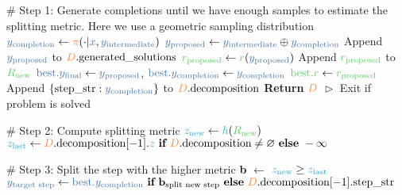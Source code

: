 \begin{algorithm}[h!]
\begin{algorithmic}[1]
        \STATE \textcolor{algcolor1}{\# Step 1: Generate completions until we have enough samples to estimate the splitting metric. Here we use a geometric sampling distribution}
            \STATE $\textcolor{algcolor3}{y_{\text{completion}}} \gets \textcolor{algcolor6}{\pi}(\cdot | \textcolor{algcolor3}{x}, \textcolor{algcolor3}{y_{\text{intermediate}}})$
            \STATE $\textcolor{algcolor3}{y_{\text{proposed}}} \gets \textcolor{algcolor3}{y_{\text{intermediate}}} \oplus \textcolor{algcolor3}{y_{\text{completion}}}$
            \STATE Append $\textcolor{algcolor3}{y_{\text{proposed}}}$ to $\textcolor{algcolor6}{D}.\text{generated\_solutions}$
            \STATE $\textcolor{algcolor4}{r_{\text{proposed}}} \gets \textcolor{algcolor4}{r}(\textcolor{algcolor3}{y_{\text{proposed}}})$
            \STATE Append $\textcolor{algcolor4}{r_{\text{proposed}}}$ to $\textcolor{algcolor4}{R_{\text{new}}}$
                \STATE $\textcolor{algcolor3}{\text{best}.y_{\text{final}}} \gets \textcolor{algcolor3}{y_{\text{proposed}}}$, $\textcolor{algcolor3}{\text{best}.y_{\text{completion}}} \gets \textcolor{algcolor3}{y_{\text{completion}}}$
                \STATE $\textcolor{algcolor4}{\text{best}.r} \gets \textcolor{algcolor4}{r_{\text{proposed}}}$
            \ENDIF
                \STATE Append $\{\text{step\_str}: \textcolor{algcolor3}{y_{\text{completion}}} \}$ to $\textcolor{algcolor6}{D}.\text{decomposition}$
                \STATE \textbf{Return} $\textcolor{algcolor6}{D}$ \hspace*{\fill} \textcolor{algcolor2}{$\vartriangleright$ Exit if problem is solved}
            \ENDIF
        \ENDWHILE

        \STATE \textcolor{algcolor1}{\# Step 2: Compute splitting metric}
        \STATE $\textcolor{algcolor5}{z_{\text{new}}} \gets \textcolor{algcolor5}{h}(\textcolor{algcolor4}{R_{\text{new}}})$
        \STATE $\textcolor{algcolor5}{z_{\text{last}}} \gets \textcolor{algcolor6}{D}.\text{decomposition}[-1].\textcolor{algcolor5}{z} \ \textbf{if} \ \textcolor{algcolor6}{D}.\text{decomposition} \neq \varnothing \ \textbf{else} \ -\infty$

        \STATE \textcolor{algcolor1}{\# Step 3: Split the step with the higher metric}
        \STATE \textbf{b}\textsubscript{} $\gets$ $\textcolor{algcolor5}{z_{\text{new}}} \geq \textcolor{algcolor5}{z_{\text{last}}}$
        \STATE $\textcolor{algcolor3}{y_{\text{target step}}} \gets \textcolor{algcolor3}{\text{best}.y_{\text{completion}}} \ \textbf{if} \ \textbf{b}\textsubscript{\text{split new step}} \ \textbf{else} \ \textcolor{algcolor6}{D}.\text{decomposition}[-1].\text{step\_str}$
        

\end{algorithmic}
\end{algorithm}
